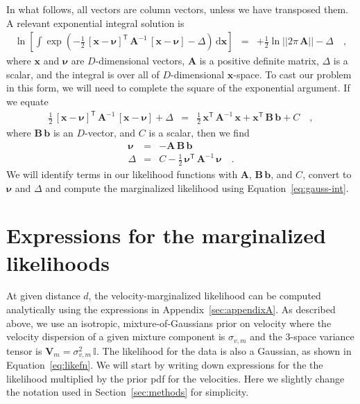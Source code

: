 \documentclass[manuscript, letterpaper]{aastex6}
\newcommand{\sectionname}{Section}
\newcommand{\eqname}{Equation}
\newcommand{\dd}{\mathrm{d}}
\newcommand{\transp}[1]{{#1}^{\!\mathsf{T}}}
\newcommand{\inv}[1]{{#1}^{-1}}
\newcommand{\bs}[1]{\boldsymbol{#1}}
\newcommand{\mat}[1]{\mathbf{#1}}
\renewcommand{\vec}[1]{\bs{#1}}
\newcommand{\eye}{\mathbb{I}}
\begin{document}
In what follows, all vectors are column vectors, unless we have transposed them.
A relevant exponential integral solution is
\begin{eqnarray}
  \ln\left[\int\exp(-\frac{1}{2}\,
    \transp{[\vec{x}-\vec{\nu}]} \,
    \inv{\mat{A}} \,
    [\vec{x}-\vec{\nu}] - \Delta) \, \dd \vec{x}\right]
  &=& +\frac{1}{2}\ln ||2\pi\,\mat{A}|| -\Delta
  \quad , \label{eq:gauss-int}
\end{eqnarray}
where $\vec{x}$ and $\vec{\nu}$ are $D$-dimensional vectors, $\mat{A}$ is a
positive definite matrix, $\Delta$ is a scalar, and the integral is over all of
$D$-dimensional $\vec{x}$-space.
To cast our problem in this form, we will need to complete the square of the
exponential argument.
If we equate
\begin{eqnarray}
  \frac{1}{2}\,\transp{[\vec{x}-\vec{\nu}]}\,\inv{\mat{A}}\,[\vec{x}-\vec{\nu}] + \Delta
  &=& \frac{1}{2}\,\transp{\vec{x}}\,\inv{\mat{A}}\,\vec{x} + \transp{\vec{x}}\,\mat{B}\,\vec{b} + C
  \quad ,
\end{eqnarray}
where $\mat{B}\,\vec{b}$ is an $D$-vector, and $C$ is a scalar, then we find
\begin{eqnarray}
  \vec{\nu} &=& -\mat{A}\,\mat{B}\,\vec{b}
  \\
  \Delta & = & C - \frac{1}{2}\,\transp{\vec{\nu}}\,\inv{\mat{A}}\,\vec{\nu}
  \quad .
\end{eqnarray}
We will identify terms in our likelihood functions with $\mat{A}$,
$\mat{B}\,\vec{b}$, and $C$, convert to $\vec{\nu}$ and $\Delta$ and compute
the marginalized likelihood using \eqname~\ref{eq:gauss-int}.

\section{Expressions for the marginalized likelihoods}\label{sec:appendix}

At given distance $d$, the velocity-marginalized likelihood can be computed
analytically using the expressions in Appendix~\ref{sec:appendixA}.
As described above, we use an isotropic, mixture-of-Gaussians prior on velocity
where the velocity dispersion of a given mixture component is $\sigma_{v,m}$ and
the 3-space variance tensor is $\mat{V}_m = \sigma_{v,m}^2 \, \eye$.
The likelihood for the data is also a Gaussian, as shown in
\eqname~\ref{eq:likefn}.
We will start by writing down expressions for the the likelihood multiplied by
the prior pdf for the velocities.
Here we slightly change the notation used in \sectionname~\ref{sec:methods} for
simplicity.
\end{document}
